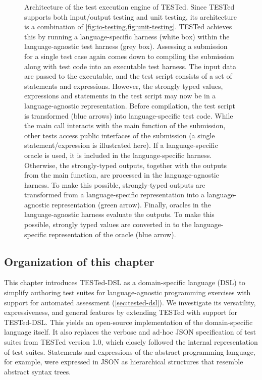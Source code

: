 \documentclass[../main]{subfiles}
\begin{document}
\begin{figure}
    \begin{wide}
        
    \end{wide}
    \caption{
        Architecture of the test execution engine of TESTed.
        Since TESTed supports both input/output testing and unit testing, its architecture is a combination of \cref{fig:io-testing,fig:unit-testing}.
        TESTed achieves this by running a language-specific harness (white box) within the language-agnostic test harness (grey box).
        Assessing a submission for a single test case again comes down to compiling the submission along with test code into an executable test harness.
        The \textcolor{ugent-ps}{input data} are passed to the executable, and the test script consists of a set of statements and expressions.
        However, the strongly typed values, expressions and statements in the test script may now be in a language-agnostic representation.
        Before compilation, the test script is transformed (blue arrows) into language-specific test code.
        While the main call interacts with the main function of the submission, other tests access public interfaces of the submission (a single statement/expression is illustrated here).
        If a language-specific oracle is used, it is included in the language-specific harness.
        Otherwise, the strongly-typed \textcolor{ugent-we}{outputs}, together with the \textcolor{ugent-we}{outputs} from the main function, are processed in the language-agnostic harness.
        To make this possible, strongly-typed \textcolor{ugent-we}{outputs} are transformed from a language-specific representation into a language-agnostic representation (green arrow).
        Finally, oracles in the language-agnostic harness evaluate the outputs.
        To make this possible, strongly typed values are converted in to the language-specific representation of the oracle (blue arrow).
    }
    \label{fig:tested-testing}
\end{figure}

\subsection{Organization of this chapter}\label{subsec:dsl-organization}

This chapter introduces TESTed-DSL as a domain-specific language (DSL) to simplify authoring test suites for language-agnostic programming exercises with support for automated assessment (\cref{sec:tested-dsl}).
We investigate its versatility, expressiveness, and general features by extending TESTed with support for TESTed-DSL\@.
This yields an open-source implementation of the domain-specific language itself.
It also replaces the verbose and ad-hoc JSON specification of test suites from TESTed version 1.0, which closely followed the internal representation of test suites.
Statements and expressions of the abstract programming language, for example, were expressed in JSON as hierarchical structures that resemble abstract syntax trees.
\end{document}
